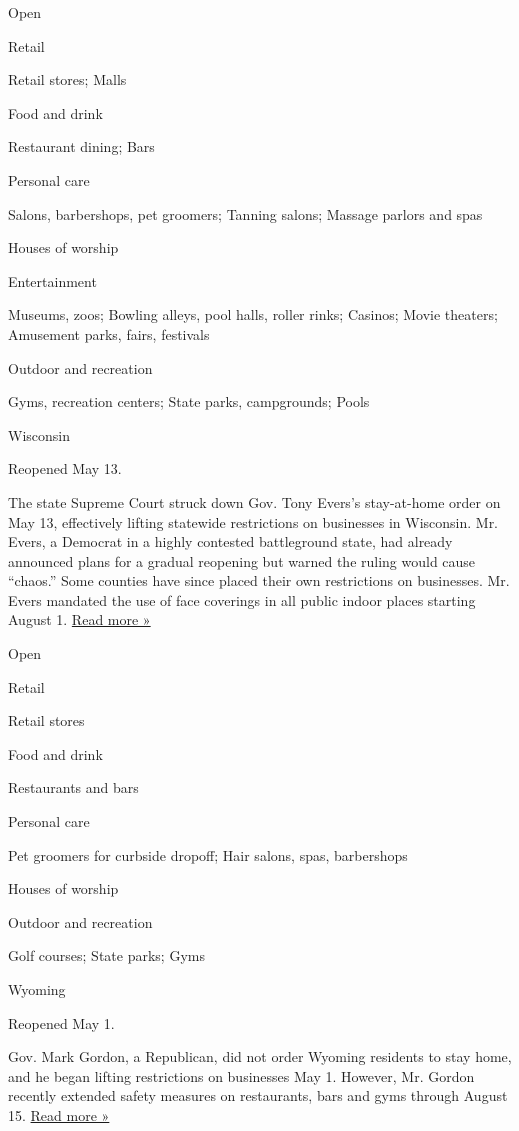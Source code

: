 Open

Retail

Retail stores; Malls

Food and drink

Restaurant dining; Bars

Personal care

Salons, barbershops, pet groomers; Tanning salons; Massage parlors and
spas

Houses of worship

Entertainment

Museums, zoos; Bowling alleys, pool halls, roller rinks; Casinos; Movie
theaters; Amusement parks, fairs, festivals

Outdoor and recreation

Gyms, recreation centers; State parks, campgrounds; Pools

Wisconsin

Reopened May 13.

The state Supreme Court struck down Gov. Tony Evers's stay-at-home order
on May 13, effectively lifting statewide restrictions on businesses in
Wisconsin. Mr. Evers, a Democrat in a highly contested battleground
state, had already announced plans for a gradual reopening but warned
the ruling would cause ``chaos.'' Some counties have since placed their
own restrictions on businesses. Mr. Evers mandated the use of face
coverings in all public indoor places starting August 1.
\href{https://www.jsonline.com/story/news/2020/05/14/wisconsin-bars-hair-salons-dine-restaurants-open-after-supreme-court-ruling-stay-home-order-evers/5194195002/}{Read
more »}

Open

Retail

Retail stores

Food and drink

Restaurants and bars

Personal care

Pet groomers for curbside dropoff; Hair salons, spas, barbershops

Houses of worship

Outdoor and recreation

Golf courses; State parks; Gyms

Wyoming

Reopened May 1.

Gov. Mark Gordon, a Republican, did not order Wyoming residents to stay
home, and he began lifting restrictions on businesses May 1. However,
Mr. Gordon recently extended safety measures on restaurants, bars and
gyms through August 15.
\href{https://cowboystatedaily.com/2020/05/07/gordon-opens-wyoming-restaurants-and-bars-by-may-15/}{Read
more »}

